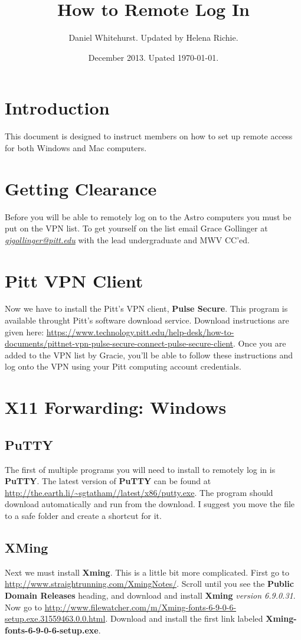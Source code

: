 \documentclass[11pt]{article}
\begin{document}
\title{How to Remote Log In}
\author{
Daniel Whitehurst. Updated by Helena Richie.}
\date{December 2013. Upated \today.}
\maketitle

\section{Introduction}
This document is designed to instruct members on how to set up remote access for both Windows and Mac computers.
\section{Getting Clearance}
Before you will be able to remotely log on to the Astro computers you must be put on the VPN list. To get yourself on the list email Grace Gollinger at \href{mailto:gjgollinger@pitt.edu}{\emph{gjgollinger@pitt.edu}} with the lead undergraduate and MWV CC'ed. 


\section{Pitt VPN Client}
Now we have to install the Pitt's VPN client, \textbf{ Pulse Secure}. This program is available throught Pitt's software download service. Download instructions are given here: \url{https://www.technology.pitt.edu/help-desk/how-to-documents/pittnet-vpn-pulse-secure-connect-pulse-secure-client}. Once you are added to the VPN list by Gracie, you'll be able to follow these instructions and log onto the VPN using your Pitt computing account credentials.

\section{X11 Forwarding: Windows}
\subsection{PuTTY}
The first of multiple programs you will need to install to remotely log in is \textbf{PuTTY}. The latest version of \textbf{PuTTY} can be found at \url{http://the.earth.li/~sgtatham//latest/x86/putty.exe}. The program should download automatically and run from the download. I suggest you move the file to a safe folder and create a shortcut for it.

\subsection{XMing}
Next we must install \textbf{Xming}. This is a little bit more complicated. First go to \url{http://www.straightrunning.com/XmingNotes/}.
Scroll until you see the \textbf{Public Domain Releases} heading, and download and install \textbf{Xming} \emph{version 6.9.0.31}. Now go to \url{http://www.filewatcher.com/m/Xming-fonts-6-9-0-6-setup.exe.31559463.0.0.html}. Download and install the first link labeled \textbf{Xming-fonts-6-9-0-6-setup.exe}. 
\end{document}
